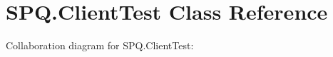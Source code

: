 \hypertarget{class_s_p_q_1_1_client_test}{}\section{S\+P\+Q.\+Client\+Test Class Reference}
\label{class_s_p_q_1_1_client_test}


Collaboration diagram for S\+P\+Q.\+Client\+Test\+:
